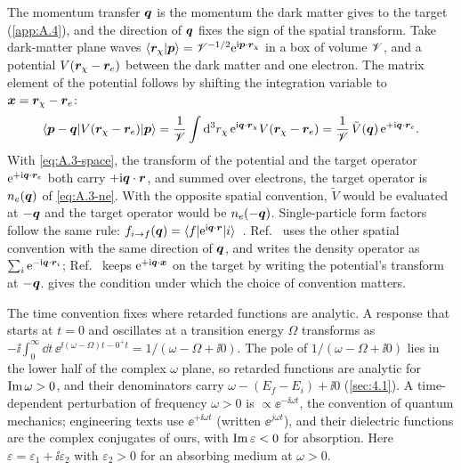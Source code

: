 The momentum transfer $\bm{q}$ is the momentum the dark matter gives to the target (\cref{app:A.4}), and the direction of $\bm{q}$ fixes the sign of the spatial transform. Take dark-matter plane waves $\langle\bm{r}_\chi|\bm{p}\rangle = \mathscr{V}^{-1/2}\mathrm{e}^{\mathrm{i}\bm{p}\cdot\bm{r}_\chi}$ in a box of volume $\mathscr{V}$, and a potential $V(\bm{r}_\chi - \bm{r}_e)$ between the dark matter and one electron. The matrix element of the potential follows by shifting the integration variable to $\bm{x} = \bm{r}_\chi - \bm{r}_e$:
\begin{equation}
  \langle\bm{p} - \bm{q}|V(\bm{r}_\chi - \bm{r}_e)|\bm{p}\rangle
  = \frac{1}{\mathscr{V}}\int\mathrm{d}^3r_\chi\,\mathrm{e}^{\mathrm{i}\bm{q}\cdot\bm{r}_\chi}V(\bm{r}_\chi - \bm{r}_e)
  = \frac{1}{\mathscr{V}}\,\tilde V(\bm{q})\,\mathrm{e}^{+\mathrm{i}\bm{q}\cdot\bm{r}_e} .
  \label{eq:A.3-vertex}
\end{equation}
With \cref{eq:A.3-space}, the transform of the potential and the target operator $\mathrm{e}^{+\mathrm{i}\bm{q}\cdot\bm{r}_e}$ both carry $+\mathrm{i}\bm{q}\cdot\bm{r}$, and summed over electrons, the target operator is $n_e(\bm{q})$ of \cref{eq:A.3-ne}. With the opposite spatial convention, $\tilde V$ would be evaluated at $-\bm{q}$ and the target operator would be $n_e(-\bm{q})$. Single-particle form factors follow the same rule: $f_{i\to f}(\bm{q}) = \langle f|\mathrm{e}^{\mathrm{i}\bm{q}\cdot\bm{r}}|i\rangle$~\cite[Eq.~(3.10)]{essig2016direct}. Ref.~\cite[Eq.~(S.4)]{hochberg2021determining} uses the other spatial convention with the same direction of $\bm{q}$, and writes the density operator as $\sum_i\mathrm{e}^{-\mathrm{i}\bm{q}\cdot\bm{r}_i}$; Ref.~\cite[Eq.~(4)]{trickle2022effective} keeps $\mathrm{e}^{+\mathrm{i}\bm{q}\cdot\bm{x}}$ on the target by writing the potential's transform at $-\bm{q}$.  gives the condition under which the choice of convention matters.

The time convention fixes where retarded functions are analytic. A response that starts at $t = 0$ and oscillates at a transition energy $\Omega$ transforms as $-\ii\int_0^\infty\dd t\,\ee^{\ii(\omega - \Omega)t - 0^+t} = 1/(\omega - \Omega + \ii 0)$. The pole of $1/(\omega - \Omega + \ii 0)$ lies in the lower half of the complex $\omega$ plane, so retarded functions are analytic for $\operatorname{Im}\omega > 0$, and their denominators carry $\omega - (E_f - E_i) + \ii 0$ (\cref{sec:4.1}). A time-dependent perturbation of frequency $\omega > 0$ is $\propto\ee^{-\ii\omega t}$, the convention of quantum mechanics; engineering texts use $\ee^{+\ii\omega t}$ (written $\ee^{j\omega t}$), and their dielectric functions are the complex conjugates of ours, with $\operatorname{Im}\varepsilon < 0$ for absorption. Here $\varepsilon = \varepsilon_1 + \ii\varepsilon_2$ with $\varepsilon_2 > 0$ for an absorbing medium at $\omega > 0$.

